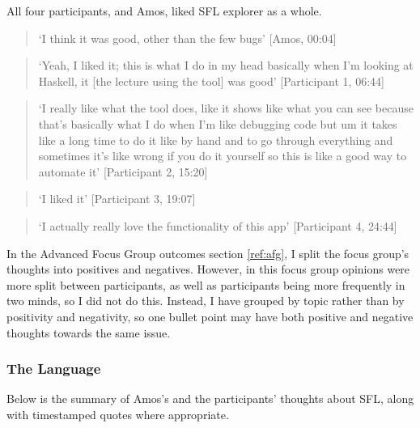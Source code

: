 All four participants, and Amos, liked SFL explorer as a whole. 
\noindent\begin{quotation}
\noindent`I think it was good, other than the few bugs' [Amos, 00:04]
\end{quotation}
\noindent\begin{quotation}
\noindent`Yeah, I liked it; this is what I do in my head basically when I'm looking at Haskell, it [the lecture using the tool] was good' [Participant 1, 06:44]
\end{quotation}
\noindent\begin{quotation}
\noindent`I really like what the tool does, like it
shows like what you can see because that's basically what I do when I'm like debugging code but
um it takes like a long time to do it like by hand and to go through everything and sometimes it's
like wrong if you do it yourself so this is like a good way to automate it' [Participant 2, 15:20]
\end{quotation}
\noindent\begin{quotation}
\noindent`I liked it' [Participant 3, 19:07]
\end{quotation}
\noindent\begin{quotation}
\noindent`I actually really love the functionality of this app' [Participant 4, 24:44]
\end{quotation}


In the Advanced Focus Group outcomes section \ref{ref:afg}, I split the focus group's thoughts into positives and negatives. However, in this focus group opinions were more split between participants, as well as participants being more frequently in two minds, so I did not do this. Instead, I have grouped by topic rather than by positivity and negativity, so one bullet point may have both positive and negative thoughts towards the same issue. 

\subsubsection{The Language}
Below is the summary of Amos's and the participants' thoughts about \ac{SFL}, along with timestamped quotes where appropriate.
